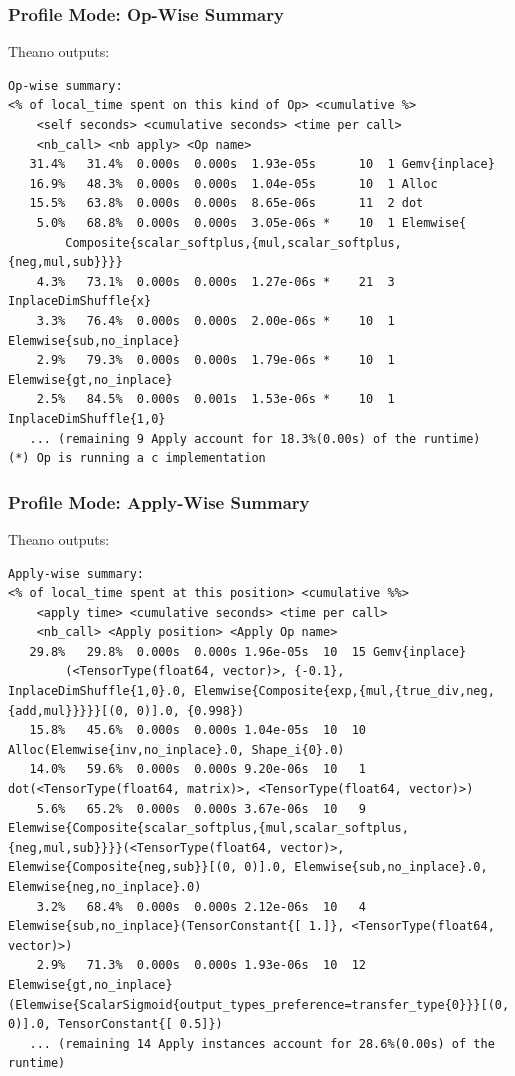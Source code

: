 \documentclass[a4paper,9pt]{beamer}
\begin{document}
\begin{frame}[fragile]
\frametitle{Profile Mode: Op-Wise Summary}
Theano outputs:
\vfill
\begin{Verbatim}
Op-wise summary:
<% of local_time spent on this kind of Op> <cumulative %>
    <self seconds> <cumulative seconds> <time per call>
    <nb_call> <nb apply> <Op name>
   31.4%   31.4%  0.000s  0.000s  1.93e-05s      10  1 Gemv{inplace}
   16.9%   48.3%  0.000s  0.000s  1.04e-05s      10  1 Alloc
   15.5%   63.8%  0.000s  0.000s  8.65e-06s      11  2 dot
    5.0%   68.8%  0.000s  0.000s  3.05e-06s *    10  1 Elemwise{
        Composite{scalar_softplus,{mul,scalar_softplus,{neg,mul,sub}}}}
    4.3%   73.1%  0.000s  0.000s  1.27e-06s *    21  3 InplaceDimShuffle{x}
    3.3%   76.4%  0.000s  0.000s  2.00e-06s *    10  1 Elemwise{sub,no_inplace}
    2.9%   79.3%  0.000s  0.000s  1.79e-06s *    10  1 Elemwise{gt,no_inplace}
    2.5%   84.5%  0.000s  0.001s  1.53e-06s *    10  1 InplaceDimShuffle{1,0}
   ... (remaining 9 Apply account for 18.3%(0.00s) of the runtime)
(*) Op is running a c implementation
\end{Verbatim}
\end{frame}

\begin{frame}[fragile]
\frametitle{Profile Mode: Apply-Wise Summary}
Theano outputs:
\vfill
\begin{Verbatim}
Apply-wise summary:
<% of local_time spent at this position> <cumulative %%>
    <apply time> <cumulative seconds> <time per call>
    <nb_call> <Apply position> <Apply Op name>
   29.8%   29.8%  0.000s  0.000s 1.96e-05s  10  15 Gemv{inplace}
        (<TensorType(float64, vector)>, {-0.1}, InplaceDimShuffle{1,0}.0, Elemwise{Composite{exp,{mul,{true_div,neg,{add,mul}}}}}[(0, 0)].0, {0.998})
   15.8%   45.6%  0.000s  0.000s 1.04e-05s  10  10 Alloc(Elemwise{inv,no_inplace}.0, Shape_i{0}.0)
   14.0%   59.6%  0.000s  0.000s 9.20e-06s  10   1 dot(<TensorType(float64, matrix)>, <TensorType(float64, vector)>)
    5.6%   65.2%  0.000s  0.000s 3.67e-06s  10   9 Elemwise{Composite{scalar_softplus,{mul,scalar_softplus,{neg,mul,sub}}}}(<TensorType(float64, vector)>, Elemwise{Composite{neg,sub}}[(0, 0)].0, Elemwise{sub,no_inplace}.0, Elemwise{neg,no_inplace}.0)
    3.2%   68.4%  0.000s  0.000s 2.12e-06s  10   4 Elemwise{sub,no_inplace}(TensorConstant{[ 1.]}, <TensorType(float64, vector)>)
    2.9%   71.3%  0.000s  0.000s 1.93e-06s  10  12 Elemwise{gt,no_inplace}(Elemwise{ScalarSigmoid{output_types_preference=transfer_type{0}}}[(0, 0)].0, TensorConstant{[ 0.5]})
   ... (remaining 14 Apply instances account for 28.6%(0.00s) of the runtime)
\end{Verbatim}
\end{frame}
\end{document}
